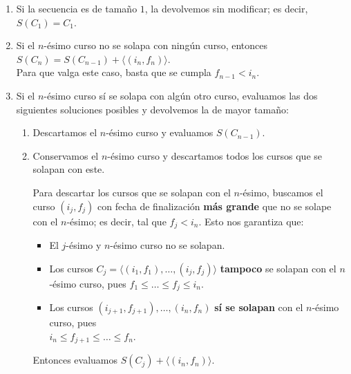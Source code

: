 \documentclass[a4paper,10pt,twoside]{article}
\begin{document}
\begin{enumerate}
    \item{
        Si la secuencia es de tamaño $1$, la devolvemos sin modificar; es decir, $S(C_1) = C_1$.
    }

    \item{
        Si el $n$-ésimo curso no se solapa con ningún curso, entonces $S(C_n) = S(C_{n-1}) + \langle (i_n, f_n) \rangle$.\\
        Para que valga este caso, basta que se cumpla $f_{n-1} < i_n$.
    }

    \item\label{n-esimo-solapa}{
        Si el $n$-ésimo curso sí se solapa con algún otro curso, evaluamos las dos siguientes soluciones posibles y devolvemos la de mayor tamaño:

        \begin{enumerate}
            \item{
                Descartamos el $n$-ésimo curso y evaluamos $S(C_{n-1})$.
            }
            \item{
                Conservamos el $n$-ésimo curso y descartamos todos los cursos que se solapan con este.

                Para descartar los cursos que se solapan con el $n$-ésimo, buscamos el curso $(i_j, f_j)$ con fecha de finalización \textbf{más grande} que no se solape con el $n$-ésimo; es decir, tal que $f_j < i_n$. Esto nos garantiza que:

                \begin{itemize}
                    \item{
                        El $j$-ésimo y $n$-ésimo curso no se solapan.
                    }
                    
                    \item{
                        Los cursos $C_j = \langle (i_1, f_1), \ldots, (i_j, f_j) \rangle$ \textbf{tampoco} se solapan con el $n$-ésimo curso, pues $f_1 \leq \ldots \leq f_j \leq i_n$.
                    }

                    \item{
                        Los cursos $(i_{j+1}, f_{j+1}), \ldots, (i_n, f_n)$ \textbf{sí se solapan} con el $n$-ésimo curso, pues\\
                        $i_n \leq f_{j+1} \leq \ldots \leq f_n$.
                    }
                \end{itemize}

                Entonces evaluamos $S(C_j) + \langle (i_n, f_n) \rangle$.
            }
        \end{enumerate}
    }
\end{enumerate}
\end{document}
